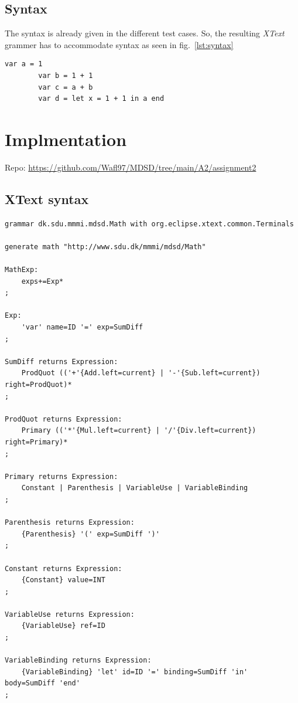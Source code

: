 \documentclass{article}
\begin{document}
\subsection{Syntax}

The syntax is already given in the different test cases. So, the resulting \textit{XText} grammer has to accommodate syntax as seen in fig.~\ref{lst:syntax}

\begin{center}
    \begin{lstlisting}[language={math}, captionpos={b}, caption={Examples of *.math syntax}, label={lst:syntax}]
        var a = 1
        var b = 1 + 1
        var c = a + b
        var d = let x = 1 + 1 in a end
    \end{lstlisting}
\end{center}

\section{Implmentation}

Repo: \url{https://github.com/Wafl97/MDSD/tree/main/A2/assignment2}

\subsection{XText syntax}
\begin{lstlisting}[caption={XText syntax}, captionpos={b}]
grammar dk.sdu.mmmi.mdsd.Math with org.eclipse.xtext.common.Terminals

generate math "http://www.sdu.dk/mmmi/mdsd/Math"

MathExp:
    exps+=Exp*
;

Exp:
    'var' name=ID '=' exp=SumDiff
;

SumDiff returns Expression:
    ProdQuot (('+'{Add.left=current} | '-'{Sub.left=current}) right=ProdQuot)*
;

ProdQuot returns Expression:
    Primary (('*'{Mul.left=current} | '/'{Div.left=current}) right=Primary)*
;

Primary returns Expression:
    Constant | Parenthesis | VariableUse | VariableBinding
;

Parenthesis returns Expression:
    {Parenthesis} '(' exp=SumDiff ')'
;

Constant returns Expression:
    {Constant} value=INT
;

VariableUse returns Expression:
    {VariableUse} ref=ID
;

VariableBinding returns Expression:
    {VariableBinding} 'let' id=ID '=' binding=SumDiff 'in' body=SumDiff 'end'
;
\end{lstlisting}
\end{document}
